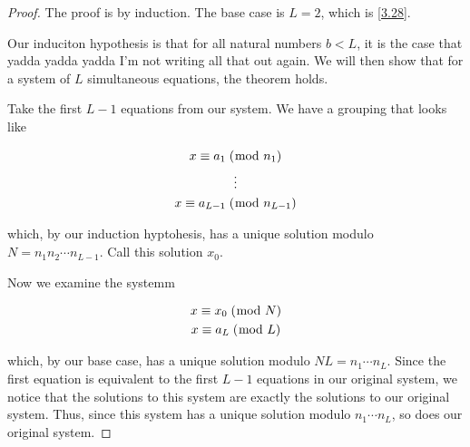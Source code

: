 \documentclass[../main.tex]{subfiles}
\begin{document}
\begin{proof}
  The proof is by induction. The base case is $L = 2$, which is \ref{3.28}.

  Our induciton hypothesis is that for all natural numbers $b < L$, it is the case that yadda yadda yadda I'm not writing all that out again. We will then show that for a system of $L$ simultaneous equations, the theorem holds.

  Take the first $L-1$ equations from our system. We have a grouping that looks like

  \begin{gather*}
    x \equiv a_1 \; (\bmod \; n_1) \\
    \vdots \\
    x \equiv a_{L-1} \; (\bmod \; n_{L-1})
  \end{gather*}

  which, by our induction hyptohesis, has a unique solution modulo $N = n_1 n_2 \cdots n_{L-1}$. Call this solution $x_0$.

  Now we examine the systemm

  \begin{gather*}
    x \equiv x_0 \; (\bmod \; N) \\
    x \equiv a_{L} \; (\bmod \; L)
  \end{gather*}

  which, by our base case, has a unique solution modulo $NL = n_1 \cdots n_L$. Since the first equation is equivalent to the first $L-1$ equations in our original system, we notice that the solutions to this system are exactly the solutions to our original system. Thus, since this system has a unique solution modulo $n_1 \cdots n_L$, so does our original system.
\end{proof}
\end{document}
